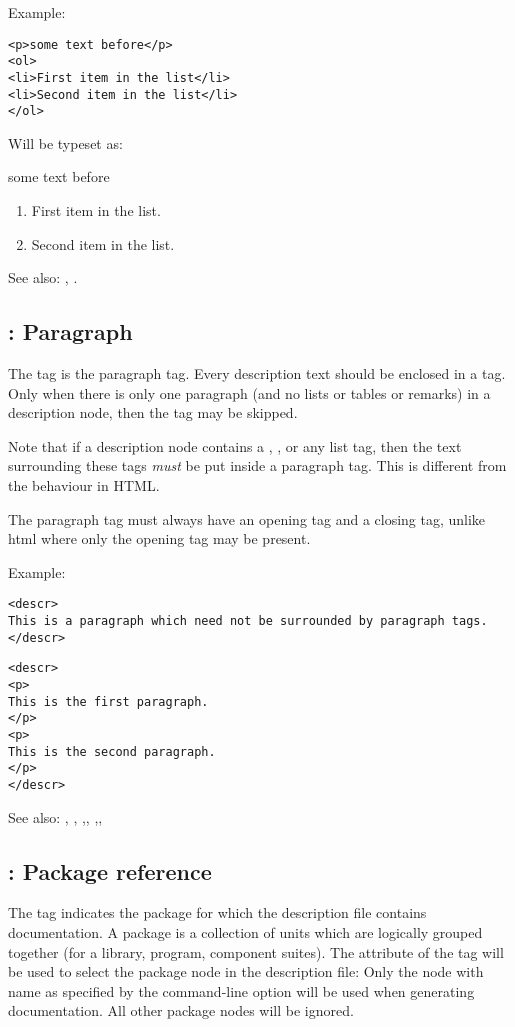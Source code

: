 Example:
\begin{verbatim}
<p>some text before</p>
<ol>
<li>First item in the list</li>
<li>Second item in the list</li>
</ol>
\end{verbatim}
Will be typeset as:

some text before
\begin{enumerate}
\item First item in the list.
\item Second item in the list.
\end{enumerate}

See also: , .


\subsection{ : Paragraph}
\label{tag:p}
The  tag is the paragraph tag. Every description text should be 
enclosed in a  tag. Only when there is only one paragraph (and no
lists or tables or remarks) in a description node, then the  tag  may
be skipped.

Note that if a description node contains a , , 
or any list tag, then the text surrounding these tags {\em must} be  put 
inside a  paragraph tag. This is different from the behaviour in HTML.

The paragraph tag must always have an opening tag and a closing tag, unlike
html where only the opening tag may be present.

Example:
\begin{verbatim}
<descr>
This is a paragraph which need not be surrounded by paragraph tags.
</descr>
\end{verbatim}
\begin{verbatim}
<descr>
<p>
This is the first paragraph.
</p>
<p>
This is the second paragraph.
</p>
</descr>
\end{verbatim}

See also: , , ,,
,,

\subsection{ : Package reference}
\label{tag:package}
The  tag indicates the package for which the description file
contains documentation. A package is a collection of units which are
logically grouped together (for a library, program, component suites). The
 attribute of the  tag will be used to select the
package node in the description file: Only the  node with name as
specified by the  command-line option will be used when
generating documentation. All other package nodes will be ignored.

